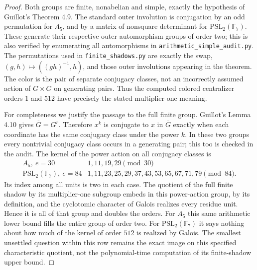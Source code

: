 \begin{proof}
Both groups are finite, nonabelian and simple, exactly the hypothesis of
Guillot's Theorem 4.9. The standard outer involution is conjugation by an
odd permutation for $A_5$, and by a matrix of nonsquare determinant for
$\mathrm{PSL}_2(\mathbb F_7)$. These generate their respective outer
automorphism groups of order two; this is also verified by enumerating
all automorphisms in \texttt{arithmetic\_simple\_audit.py}. The
permutations used in \texttt{finite\_shadows.py} are exactly the swap,
$(g,h)\mapsto((gh)^{-1},h)$, and those outer involutions appearing in
the theorem. The color is the pair of separate conjugacy classes, not
an incorrectly assumed action of $G\times G$ on generating pairs.
Thus the computed colored centralizer orders $1$ and $512$ have precisely
the stated multiplier-one meaning.

For completeness we justify the passage to the full finite group.
Guillot's Lemma 4.10 gives $\overline G=G^r$. Therefore $x^k$ is
conjugate to $x$ in $\overline G$ exactly when each coordinate has the
same conjugacy class under the power $k$. In these two groups every
nontrivial conjugacy class occurs in a generating pair; this too is
checked in the audit. The kernel of the power action on all conjugacy
classes is
\[
\begin{array}{c|l}
 A_5,\ e=30&1,11,19,29\pmod {30}\\
 \mathrm{PSL}_2(\mathbb F_7),\ e=84&
 1,11,23,25,29,37,43,53,65,67,71,79\pmod {84}.
\end{array}
\]
Its index among all units is two in each case. The quotient of the full
finite shadow by its multiplier-one subgroup embeds in this power-action
group, by its definition, and the cyclotomic character of Galois realizes
every residue unit. Hence it is all of that group and doubles the orders.
For $A_5$ this same arithmetic lower bound fills the entire group of
order two. For $\mathrm{PSL}_2(\mathbb F_7)$ it says nothing about how
much of the kernel of order $512$ is realized by Galois. The smallest
unsettled question within this row remains the exact image on this
specified characteristic quotient, not the polynomial-time computation
of its finite-shadow upper bound.
\end{proof}
